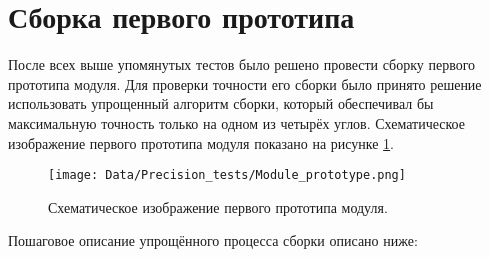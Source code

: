 \section{Сборка первого прототипа}

После всех выше упомянутых тестов было решено провести сборку первого прототипа модуля. Для проверки точности его сборки было принято решение использовать упрощенный алгоритм сборки, который обеспечивал бы максимальную точность только на одном из четырёх углов. Схематическое изображение первого прототипа модуля показано на рисунке \ref{fig:module_prototype}.

\begin{figure}[ht]\centering
\texttt{[image: Data/Precision\_tests/Module\_prototype.png]}
\caption{Схематическое изображение первого прототипа модуля.}
\label{fig:module_prototype}
\end{figure}

Пошаговое описание упрощённого процесса сборки описано ниже:

